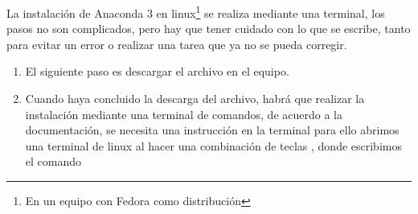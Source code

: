 \documentclass[12pt]{article}
\begin{document}
La instalación de Anaconda 3 en linux\footnote{En un equipo con Fedora como distribución} se realiza mediante una terminal, los pasos no son complicados, pero hay que tener cuidado con lo que se escribe, tanto para evitar un error o realizar una tarea que ya no se pueda corregir.
\begin{enumerate}
\item El siguiente paso es descargar el archivo en el equipo.
\item Cuando haya concluido la descarga del archivo, habrá que realizar la instalación mediante una terminal de comandos, de acuerdo a la documentación, se necesita una instrucción en la terminal para ello abrimos una terminal de linux al hacer una combinación de teclas , donde escribimos el comando


\end{enumerate}
\end{document}
